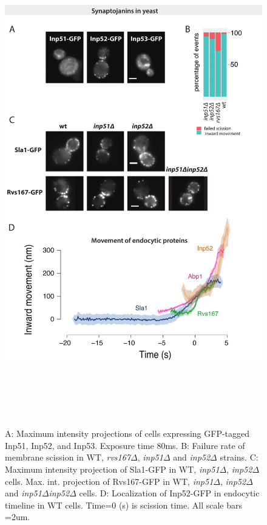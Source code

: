 		
\begin{figure}[H]
	\centering
	\includegraphics[width=21cm,height=21cm,keepaspectratio]{figures/results_final/inp}
	\caption[Synaptojanin-like proteins in yeast]
	{A: Maximum intensity projections of cells expressing GFP-tagged Inp51, Inp52, and Inp53. Exposure time 80ms.
		B: Failure rate of membrane scission in WT, \textit{rvs167$\Delta$}, \textit{inp51$\Delta$} and \textit{inp52$\Delta$} strains.
		C: Maximum intensity projection of Sla1-GFP in WT,  \textit{inp51$\Delta$},  \textit{inp52$\Delta$} cells. Max. int. projection of Rvs167-GFP in WT,  \textit{inp51$\Delta$},  \textit{inp52$\Delta$} and  \textit{inp51$\Delta$}\textit{inp52$\Delta$}   cells.
		D: Localization of Inp52-GFP in endocytic timeline in WT cells. Time=0 (s) is scission time.
		All scale bars =2um.
		\label{fig_inp}}
\end{figure}

